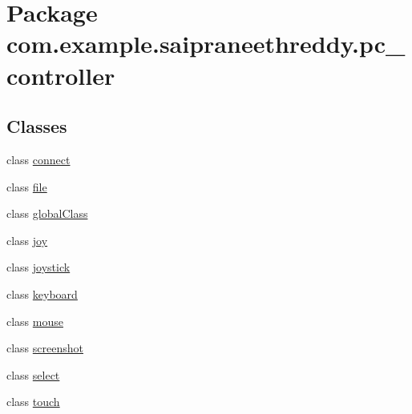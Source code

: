\hypertarget{namespacecom_1_1example_1_1saipraneethreddy_1_1pc__controller}{}\section{Package com.\+example.\+saipraneethreddy.\+pc\+\_\+controller}
\label{namespacecom_1_1example_1_1saipraneethreddy_1_1pc__controller}
\subsection*{Classes}
\begin{DoxyCompactItemize}
\item 
class \hyperlink{classcom_1_1example_1_1saipraneethreddy_1_1pc__controller_1_1connect}{connect}
\item 
class \hyperlink{classcom_1_1example_1_1saipraneethreddy_1_1pc__controller_1_1file}{file}
\item 
class \hyperlink{classcom_1_1example_1_1saipraneethreddy_1_1pc__controller_1_1globalClass}{global\+Class}
\item 
class \hyperlink{classcom_1_1example_1_1saipraneethreddy_1_1pc__controller_1_1joy}{joy}
\item 
class \hyperlink{classcom_1_1example_1_1saipraneethreddy_1_1pc__controller_1_1joystick}{joystick}
\item 
class \hyperlink{classcom_1_1example_1_1saipraneethreddy_1_1pc__controller_1_1keyboard}{keyboard}
\item 
class \hyperlink{classcom_1_1example_1_1saipraneethreddy_1_1pc__controller_1_1mouse}{mouse}
\item 
class \hyperlink{classcom_1_1example_1_1saipraneethreddy_1_1pc__controller_1_1screenshot}{screenshot}
\item 
class \hyperlink{classcom_1_1example_1_1saipraneethreddy_1_1pc__controller_1_1select}{select}
\item 
class \hyperlink{classcom_1_1example_1_1saipraneethreddy_1_1pc__controller_1_1touch}{touch}
\end{DoxyCompactItemize}
